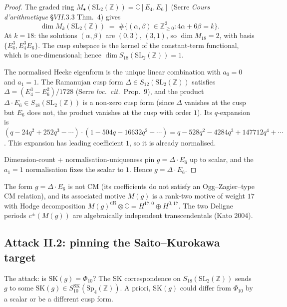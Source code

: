 \begin{proof}
The graded ring $M_\bullet(\mathrm{SL}_2(\mathbb{Z})) = \mathbb{C}[E_4,
E_6]$ (Serre \emph{Cours d'arithmetique} \S$VII$.$3$.$3$ Thm.~$4$)
gives
\[
 \dim M_k(\mathrm{SL}_2(\mathbb{Z})) \;=\; \#\{(\alpha, \beta) \in
 \mathbb{Z}_{\geq 0}^2 : 4 \alpha + 6 \beta = k\}.
\]
At $k = 18$: the solutions $(\alpha, \beta)$ are $(0, 3)$, $(3, 1)$,
so $\dim M_{18} = 2$, with basis $\{E_6^3, E_4^3 E_6\}$.  The cusp
subspace is the kernel of the constant-term functional, which is
one-dimensional; hence $\dim S_{18}(\mathrm{SL}_2(\mathbb{Z})) = 1$.

The normalised Hecke eigenform is the unique linear combination
with $a_0 = 0$ and $a_1 = 1$.  The Ramanujan cusp form $\Delta \in
S_{12}(\mathrm{SL}_2(\mathbb{Z}))$ satisfies $\Delta = (E_4^3 -
E_6^2) / 1728$ (Serre \emph{loc.~cit.}~Prop.~$9$), and the product
$\Delta \cdot E_6 \in S_{18}(\mathrm{SL}_2(\mathbb{Z}))$ is a
non-zero cusp form (since $\Delta$ vanishes at the cusp but $E_6$
does not, the product vanishes at the cusp with order $1$).  Its
$q$-expansion is $(q - 24 q^2 + 252 q^3 - \cdots) \cdot (1 - 504 q
- 16632 q^2 - \cdots) = q - 528 q^2 - 4284 q^3 + 147712 q^4 +
\cdots$.  This expansion has leading coefficient $1$, so it is
already normalised.

Dimension-count + normalisation-uniqueness pin $g = \Delta \cdot E_6$
up to scalar, and the $a_1 = 1$ normalisation fixes the scalar to
$1$.  Hence $g = \Delta \cdot E_6$.
\end{proof}

\begin{remark}
\label{rem:g-es-cm-free}
The form $g = \Delta \cdot E_6$ is not CM (its coefficients do not
satisfy an Ogg--Zagier--type CM relation), and its associated
motive $M(g)$ is a rank-two motive of weight $17$ with Hodge
decomposition $M(g)^{\mathrm{dR}} \otimes \mathbb{C} = H^{17, 0}
\oplus H^{0, 17}$.  The two Deligne periods $c^\pm(M(g))$ are
algebraically independent transcendentals (Kato 2004).
\end{remark}

\subsection*{Attack II.2: pinning the Saito--Kurokawa target}

The attack: is $\mathrm{SK}(g) = \Phi_{10}$?  The SK correspondence
on $S_{18}(\mathrm{SL}_2(\mathbb{Z}))$ sends $g$ to some
$\mathrm{SK}(g) \in S_{10}^{\mathrm{SK}}(\mathrm{Sp}_4(\mathbb{Z}))$.
A priori, $\mathrm{SK}(g)$ could differ from $\Phi_{10}$ by a scalar
or be a different cusp form.

